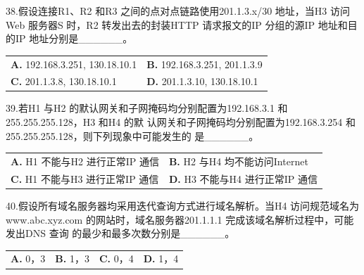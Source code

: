 \documentclass[UTF8,11pt]{ctexart}
\begin{document}
38.假设连接R1、R2 和R3 之间的点对点链路使用201.1.3.x/30 地址，当H3 访问Web 服务器S 时，R2 转发出去的封装HTTP 请求报文的IP 分组的源IP 地址和目的IP 地址分别是\_\_\_\_\_\_。


\begin{center}\begin{tabular}{>{\raggedright\arraybackslash}p{\dimexpr(\linewidth-4\tabcolsep)/2\relax}>{\raggedright\arraybackslash}p{\dimexpr(\linewidth-4\tabcolsep)/2\relax}}
\textbf{A.} 192.\allowbreak{}168.\allowbreak{}3.\allowbreak{}251, 130.\allowbreak{}18.\allowbreak{}10.\allowbreak{}1 & \textbf{B.} 192.\allowbreak{}168.\allowbreak{}3.\allowbreak{}251, 201.\allowbreak{}1.\allowbreak{}3.\allowbreak{}9\\[.35em]
\textbf{C.} 201.\allowbreak{}1.\allowbreak{}3.\allowbreak{}8, 130.\allowbreak{}18.\allowbreak{}10.\allowbreak{}1 & \textbf{D.} 201.\allowbreak{}1.\allowbreak{}3.\allowbreak{}10, 130.\allowbreak{}18.\allowbreak{}10.\allowbreak{}1\\[.35em]\end{tabular}\end{center}

39.若H1 与H2 的默认网关和子网掩码均分别配置为192.168.3.1 和255.255.255.128，H3 和H4 的默 认网关和子网掩码均分别配置为192.168.3.254 和255.255.255.128，则下列现象中可能发生的 是\_\_\_\_\_\_。


\begin{center}\begin{tabular}{>{\raggedright\arraybackslash}p{\dimexpr(\linewidth-4\tabcolsep)/2\relax}>{\raggedright\arraybackslash}p{\dimexpr(\linewidth-4\tabcolsep)/2\relax}}
\textbf{A.} H1 不能与H2 进行正常IP 通信 & \textbf{B.} H2 与H4 均不能访问Internet\\[.35em]
\textbf{C.} H1 不能与H3 进行正常IP 通信 & \textbf{D.} H3 不能与H4 进行正常IP 通信\\[.35em]\end{tabular}\end{center}

40.假设所有域名服务器均采用迭代查询方式进行域名解析。当H4 访问规范域名为 www.abc.xyz.com 的网站时，域名服务器201.1.1.1 完成该域名解析过程中，可能发出DNS 查询 的最少和最多次数分别是\_\_\_\_\_\_。


\begin{center}\begin{tabular}{>{\raggedright\arraybackslash}p{\dimexpr(\linewidth-8\tabcolsep)/4\relax}>{\raggedright\arraybackslash}p{\dimexpr(\linewidth-8\tabcolsep)/4\relax}>{\raggedright\arraybackslash}p{\dimexpr(\linewidth-8\tabcolsep)/4\relax}>{\raggedright\arraybackslash}p{\dimexpr(\linewidth-8\tabcolsep)/4\relax}}
\textbf{A.} 0，3 & \textbf{B.} 1，3 & \textbf{C.} 0，4 & \textbf{D.} 1，4\\[.35em]\end{tabular}\end{center}
\end{document}
